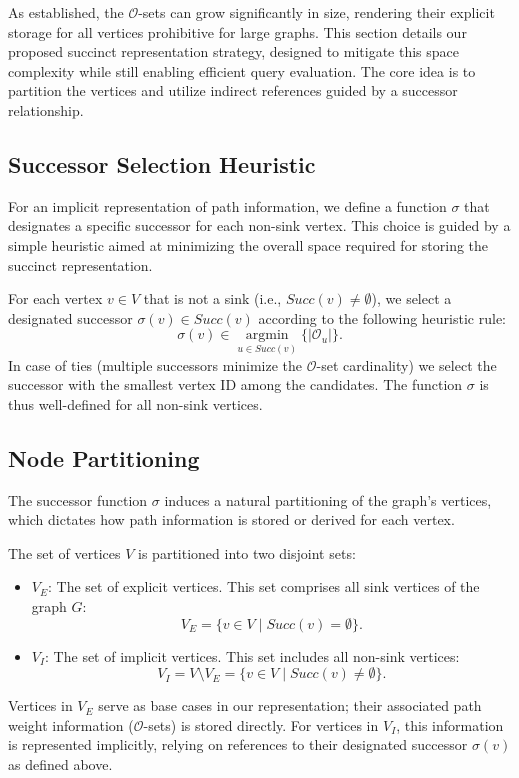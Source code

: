 As established, the $\mathcal{O}$-sets can grow significantly in size, rendering their explicit storage for all vertices prohibitive for large graphs. This section details our proposed succinct representation strategy, designed to mitigate this space complexity while still enabling efficient query evaluation. The core idea is to partition the vertices and utilize indirect references guided by a successor relationship.

\subsection*{Successor Selection Heuristic}
\label{subsec:successor_selection}

For an implicit representation of path information, we define a function $\sigma$ that designates a specific successor for each non-sink vertex. This choice is guided by a simple heuristic aimed at minimizing the overall space required for storing the succinct representation.

\begin{definition}
    \label{def:sigma_function}
    For each vertex $v \in V$ that is not a sink (i.e., $Succ(v) \neq \emptyset$), we select a designated successor $\sigma(v) \in Succ(v)$ according to the following heuristic rule:
    \[ \sigma(v) \in \underset{u \in Succ(v)}{\operatorname{argmin}} \{ |\mathcal{O}_u| \}. \]
    In case of ties (multiple successors minimize the $\mathcal{O}$-set cardinality) we select the successor with the smallest vertex ID among the candidates. The function $\sigma$ is thus well-defined for all non-sink vertices.
\end{definition}

\subsection*{Node Partitioning}
\label{subsec:node_partitioning}

The successor function $\sigma$ induces a natural partitioning of the graph's vertices, which dictates how path information is stored or derived for each vertex.

\begin{definition}
    \label{def:explicit_implicit}
    The set of vertices $V$ is partitioned into two disjoint sets:
    \begin{itemize}
        \item $V_E$: The set of explicit vertices. This set comprises all sink vertices of the graph $G$:
              \[ V_E = \{ v \in V \mid Succ(v) = \emptyset \}. \]
        \item $V_I$: The set of implicit vertices. This set includes all non-sink vertices:
              \[ V_I = V \setminus V_E = \{ v \in V \mid Succ(v) \neq \emptyset \}. \]
    \end{itemize}
\end{definition}
Vertices in $V_E$ serve as base cases in our representation; their associated path weight information ($\mathcal{O}$-sets) is stored directly. For vertices in $V_I$, this information is represented implicitly, relying on references to their designated successor $\sigma(v)$ as defined above.

